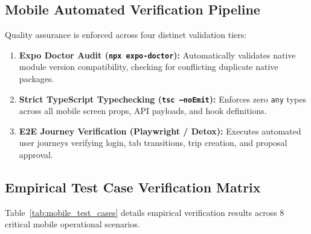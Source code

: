 \documentclass[conference,10pt,a4paper]{IEEEtran}
\begin{document}
\subsection{Mobile Automated Verification Pipeline}
Quality assurance is enforced across four distinct validation tiers:
\begin{enumerate}
    \item \textbf{Expo Doctor Audit (\texttt{npx expo-doctor}):} Automatically validates native module version compatibility, checking for conflicting duplicate native packages.
    \item \textbf{Strict TypeScript Typechecking (\texttt{tsc --noEmit}):} Enforces zero \texttt{any} types across all mobile screen props, API payloads, and hook definitions.
    \item \textbf{E2E Journey Verification (Playwright / Detox):} Executes automated user journeys verifying login, tab transitions, trip creation, and proposal approval.
\end{enumerate}

\subsection{Empirical Test Case Verification Matrix}
Table~\ref{tab:mobile_test_cases} details empirical verification results across 8 critical mobile operational scenarios.
\end{document}

